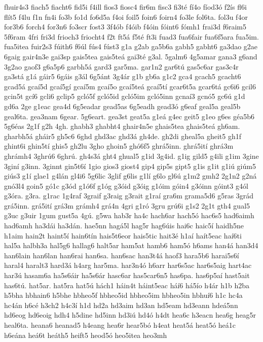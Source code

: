 {fhuir4s3
fiach5
fiacht6
fid5i
f4ill
fios3
fiosc4
fir6m
fisc3
fi3té
fí4o
fíod3ó
f2ís
fl6i
flít5
f4lu
f1n
fn4i
fo3b
fo1d
fo6d5a
f4oi
foil5
foin6
foirn4
fo3le
fol6ta.
fol3u
f4or
for3b6
forch4
for3n6
fo3scr
fost3
3f4ób
f4óib
f4óin
fóint6
fómh1
frai3d
f6raim5
5f6ram
4fri
fri3d
frioch3
friocht4
f2t
ft5á
f5té
ft3i
fuad3
fua6fair
fua6f5ara
fua5im.
fua5itea
fuir2s3
fúith6
f6úl
fús4
fúst3
g1a
g2ab
ga5b6a
gabh5
gabht6
ga3dao
g2ae
6gaig
gair4n3e
gai3sp
gais5tea
gais5teá
gai3té
g3al.
5galm6
4g5amar
gana3
g6and
3g2ao
gaof3
g6a5p6
garbh5á
gard3
gar5ma.
gar1n2
gar6tú
gas5c6ar
gas3c4r
ga3stá
g1á
gáir5
6gáis
g3ál
6g5ánt
3g4ár
g1b
gb6a
g1c2
gca4
gcach5
gcacht6
gcad5á
gcaí5d
gcaí5gí
gcaí5m
gcaí5o
gcaí5teá
gcaí5tí
gcar6t5a
gcar6tá
gc6i6
gcil6
gcin5t
gcí6
gcli6
gclip5
gcló5f
gcló5id
gcló5im
gcló5inn
gcnaí3
gcnó5
gc6ú
g1d
gd6a
2ge
g1eac
gea4d
6g5eadar
gead5as
6g5eadh
gead3ó
g6eaf
geal5a
geal5b
geal6ta.
gea3nam
6gear.
5g6eart.
gea3st
geat5a
g1eá
g4ec
geit5
g1eo
g6es
géa5b6
5g6éas
2g1f
g2h
4gh.
ghabh3
ghabht4
ghair4n5e
ghais5tea
ghais5teá
gh6am.
gharbh5á
gháir5
gh5c6
6ghd
ghd3ac
ghd3á
gh4de.
gh2di
gheal5a
gheit5
gh1f
ghint6i
ghin5tí
ghis5
gh2lu
3gho
ghoin5
ghó6f5
ghrá5inn.
ghrá5ití
ghrá3m
ghrámh4
3ghrú6
6ghrú.
gh4s3á
ght4
ghual5
g1id
3g4id.
g1ig
gild5
g4ili
g1im
3gine
3giní
g3inn.
3ginnt
gin5t6í
1gio
gios3
giost4
gip4
gip5s
gipt5
g1is
g1it
g1iú
giúm5
giús3
g1í
glae1
g4lán
gl4i6
5g6lic
3glif
g6lis
g1lí
g6lo
gl6ú
g1m2
gmh2
2g1n2
g2ná
gnó3l4
goin5
gó1c
g3ód
g1ó6f
g1óg
g3óid
g3óig
g1óim
góin4
g3óinn
góint3
g4ól
g3óra.
g3ra.
g1rac
1g4raf
3graif
g3raig
g3rait
g1raí
gra6m
grama5d6
g5ras
3grád
grá5inn.
grá5ití
grá3m
grámh4
grá4n
4gri
g1ró
3gru
grú6i
g1s2
2g1t
gth4
gual5
g3uc
g3uir
1gum
gust5a
4gú.
g5wa
hab3r
ha4c
hach6ar
hach5ó
hac6s5
had6aimh
had6amh
ha3dái
ha3dán.
hae5nn
hagá5l
hag5r
hag6úis
hai6c
haic5í
haidh5ne
h1aim
hain2t
haint5í
hain6tín
hais5t6eor
hais5tic
hait3é
h1aí
haít5eac
haí6ti
hal5a
halbh3a
hal5g6
hallag6
halt5ar
ham5at
hamb6
ham5ó
h6ams
han4á
han3d4
han6lain
han6lan
han6rai
han6sa.
han6sac
han3t4á
haof3
hara5b6
harai5s6í
haral4
haralt3
hard3á
h4arg
har5ma.
har3n4ó
h6arr
har6s5ac
har6s5aig
hart4ac
har3ú
hasam6a
ha5s6áir
ha5s6ár
hasc6ar
has5car6n5
has6pa.
has6p5aí
hast5ait
has6tú.
hat5ar.
hat5ra
hat5ú
hách1
háin4t
háint5eac
háí6
há5ío
h4ár
h1b
h2ba
h5bha
hbhain6
h5bhe
hbheo5f
hbheo5id
hbheo5im
hbheo5in
hbhuí6
h1c
hc4a
hc4án
h6cé
h3ch2
h4c3í
h1d
hd2a
hd3aim
hd3an
hd5eam
hd3eann
hdeá5nn
hd6eog
hd6eoig
hdh4
h5dine
hd5inn
hd3iú
hd4ó
h4dt
hea6c
h3eacn
hea6g
heag5r
heal6ta.
heana6
heanad5
h4eang
hea6r
hear5bó
h4eat
heat5á
heat5ó
heá1c
h6eána
heá6t
heáth5
heift5
heod5ó
heo5itea
heo3mh
}
